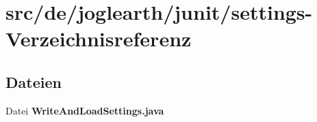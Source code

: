 \section{src/de/joglearth/junit/settings-\/\-Verzeichnisreferenz}
\label{dir_c261101898c687f34236dad9f14401c1}
\subsection*{Dateien}
\begin{DoxyCompactItemize}
\item 
Datei {\bfseries Write\-And\-Load\-Settings.\-java}
\end{DoxyCompactItemize}
